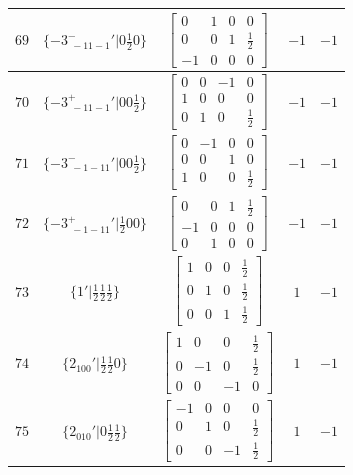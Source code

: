 \documentclass[fleqn,8pt]{jsarticle}
\begin{document}
\begin{longtable}{ccccc}
$ 69 $ & $ \{-3^{-}_{\,\,-11-1}{}'|0 \frac{1}{2} 0\} $ & $ \begin{bmatrix} 0 & 1 & 0 & 0 \\ 0 & 0 & 1 & \frac{1}{2} \\ -1 & 0 & 0 & 0 \end{bmatrix} $ & $ -1 $ & $ -1 $ \\ \hline
$ 70 $ & $ \{-3^{+}_{\,\,-11-1}{}'|0 0 \frac{1}{2}\} $ & $ \begin{bmatrix} 0 & 0 & -1 & 0 \\ 1 & 0 & 0 & 0 \\ 0 & 1 & 0 & \frac{1}{2} \end{bmatrix} $ & $ -1 $ & $ -1 $ \\ \hline
$ 71 $ & $ \{-3^{-}_{\,\,-1-11}{}'|0 0 \frac{1}{2}\} $ & $ \begin{bmatrix} 0 & -1 & 0 & 0 \\ 0 & 0 & 1 & 0 \\ 1 & 0 & 0 & \frac{1}{2} \end{bmatrix} $ & $ -1 $ & $ -1 $ \\ \hline
$ 72 $ & $ \{-3^{+}_{\,\,-1-11}{}'|\frac{1}{2} 0 0\} $ & $ \begin{bmatrix} 0 & 0 & 1 & \frac{1}{2} \\ -1 & 0 & 0 & 0 \\ 0 & 1 & 0 & 0 \end{bmatrix} $ & $ -1 $ & $ -1 $ \\ \hline
$ 73 $ & $ \{1{}'|\frac{1}{2} \frac{1}{2} \frac{1}{2}\} $ & $ \begin{bmatrix} 1 & 0 & 0 & \frac{1}{2} \\ 0 & 1 & 0 & \frac{1}{2} \\ 0 & 0 & 1 & \frac{1}{2} \end{bmatrix} $ & $ 1 $ & $ -1 $ \\ \hline
$ 74 $ & $ \{2{}_{100}{}'|\frac{1}{2} \frac{1}{2} 0\} $ & $ \begin{bmatrix} 1 & 0 & 0 & \frac{1}{2} \\ 0 & -1 & 0 & \frac{1}{2} \\ 0 & 0 & -1 & 0 \end{bmatrix} $ & $ 1 $ & $ -1 $ \\ \hline
$ 75 $ & $ \{2{}_{010}{}'|0 \frac{1}{2} \frac{1}{2}\} $ & $ \begin{bmatrix} -1 & 0 & 0 & 0 \\ 0 & 1 & 0 & \frac{1}{2} \\ 0 & 0 & -1 & \frac{1}{2} \end{bmatrix} $ & $ 1 $ & $ -1 $ \\ \hline

\end{longtable}
\end{document}
